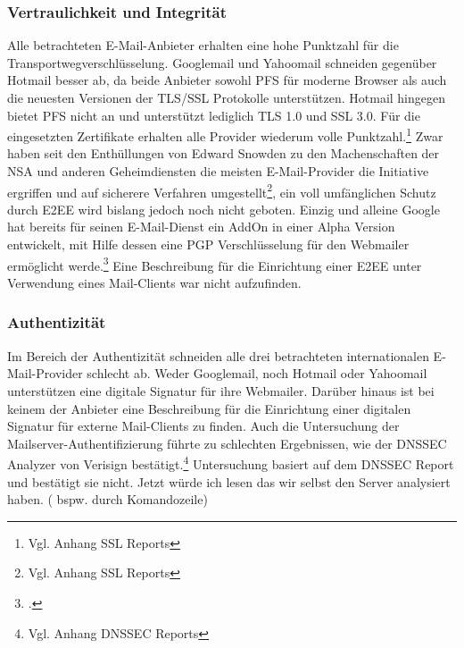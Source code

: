\documentclass  [paper=a4,
				fontsize=12pt,
				listof=totoc,
				bibliography=totoc
				]{scrreprt}
\begin{document}
			\subsubsection{Vertraulichkeit und Integrität}
			Alle betrachteten E-Mail-Anbieter erhalten eine hohe Punktzahl für die Transportwegverschlüsselung. Googlemail und Yahoomail schneiden gegenüber Hotmail besser ab, da beide Anbieter sowohl \ac{PFS} für moderne Browser als auch die neuesten Versionen der \ac{TLS/SSL} Protokolle unterstützen. Hotmail hingegen bietet \ac{PFS} nicht an und unterstützt lediglich \ac{TLS} 1.0 und \ac{SSL} 3.0.
			Für die eingesetzten Zertifikate erhalten alle Provider wiederum volle Punktzahl.\footnote{Vgl. Anhang SSL Reports}
			\medskip
			Zwar haben seit den Enthüllungen von Edward Snowden zu den Machenschaften der \ac{NSA} und anderen Geheimdiensten die meisten E-Mail-Provider die Initiative ergriffen und  auf sicherere Verfahren umgestellt\footnote{Vgl. Anhang SSL Reports}, ein voll umfänglichen Schutz durch \ac{E2EE} wird bislang jedoch noch nicht geboten. Einzig und alleine Google hat bereits für seinen E-Mail-Dienst ein AddOn in einer Alpha Version entwickelt, mit Hilfe dessen eine PGP Verschlüsselung für den Webmailer ermöglicht werde.\footcite[Vgl.][]{Kirsch} 
			Eine Beschreibung für die Einrichtung einer \ac{E2EE} unter Verwendung eines Mail-Clients war nicht aufzufinden.
			\subsubsection{Authentizität}
			Im Bereich der Authentizität schneiden alle drei betrachteten internationalen E-Mail-Provider schlecht ab.
			Weder Googlemail, noch Hotmail oder Yahoomail unterstützen eine digitale Signatur für ihre Webmailer. Darüber hinaus ist bei keinem der Anbieter eine Beschreibung für die Einrichtung einer digitalen Signatur für externe Mail-Clients zu finden. 
			\medskip
			Auch die Untersuchung der Mailserver-Authentifizierung führte zu schlechten Ergebnissen, wie der \ac{DNSSEC} Analyzer von Verisign bestätigt.\footnote{Vgl. Anhang DNSSEC Reports} 
			\color{darkred}Untersuchung basiert auf dem DNSSEC Report und bestätigt sie nicht. Jetzt würde ich lesen das wir selbst den Server analysiert haben. ( bspw. durch Komandozeile)\color{black}
\end{document}
